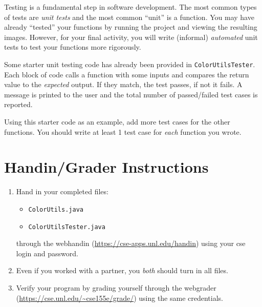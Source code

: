 \documentclass[12pt]{scrartcl}
\begin{document}
Testing is a fundamental step in software development.  The most common types
of tests are \emph{unit tests} and the most common ``unit'' is a function.
You may have already ``tested'' your functions by running the project and 
viewing the resulting images.  However, for your final activity, you will
write (informal) \emph{automated} unit tests to test your functions more 
rigorously.  

Some starter unit testing code has already been provided in 
\texttt{ColorUtilsTester}.  Each block of code calls a function
with some inputs and compares the return value to the \emph{expected}
output.  If they match, the test passes, if not it fails.  A message is
printed to the user and the total number of passed/failed test cases is
reported.  

Using this starter code as an example, add more test cases for the 
other functions.  You should write at least 1 test case for 
\emph{each} function you wrote.  

\section{Handin/Grader Instructions}

\begin{enumerate}
  \item Hand in your completed files:
  \begin{itemize}
    \item \texttt{ColorUtils.java}
    \item \texttt{ColorUtilsTester.java}
  \end{itemize}
  through the webhandin (\url{https://cse-apps.unl.edu/handin}) 
  using your cse login and password.  
  \item Even if you worked with a partner, you \emph{both} should
  turn in all files.
  \item Verify your program by grading yourself through the
  webgrader (\url{https://cse.unl.edu/~cse155e/grade/}) using the
  same credentials.
\end{enumerate}
\end{document}
